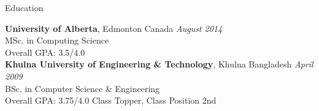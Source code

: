 \documentclass{resume} %
\begin{document}

\begin{rSection}{Education}

{\bf University of Alberta}, Edmonton Canada \hfill {\em August 2014}\\ 
MSc. in Computing Science \\
Overall GPA: 3.5/4.0\\
{\bf Khulna University of Engineering \& Technology}, Khulna Bangladesh \hfill {\em April 2009} \\ 
BSc. in Computer Science \& Engineering\\
Overall GPA: 3.75/4.0 Class Topper, Class Position 2nd

\end{rSection}

\end{document}
